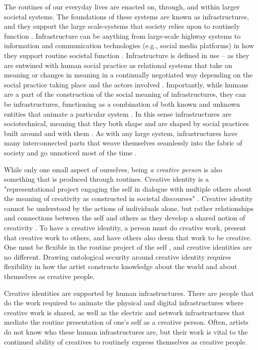     The routines of our everyday lives are enacted on, through, and within larger societal systems. The foundations of these systems are known as infrastructures, and they support the large scale-systems that society relies upon to routinely function \cite{edwards2003infrastructure}. Infrastructure can be anything from large-scale highway systems to information and communication technologies (e.g., social media platforms) in how they support routine societal function \cite{hanseth2010design}. Infrastructure is defined in use – as they are entwined with human social practice as relational systems that take on meaning or changes in meaning in a continually negotiated way depending on the social practice taking place and the actors involved \cite{star1996steps}. Importantly, while humans are a part of the construction of the social meaning of infrastructures, they can be infrastructures, functioning as a combination of both known and unknown entities that animate a particular system \cite{LeeDourishMark2006}. In this sense infrastructures are sociotechnical, meaning that they both shape and are shaped by social practices built around and with them \cite{edwards2003infrastructure, star1996steps}. As with any large system, infrastructures have many interconnected parts that weave themselves seamlessly into the fabric of society and go unnoticed most of the time \cite{star1996steps}. \par

    While only one small aspect of ourselves, being \textit{a creative person} is also something that is produced through routines. Creative identity is a "representational project engaging the self in dialogue with multiple others about the meaning of creativity as constructed in societal discourses" \cite{gluaveanu2014creativity}. Creative identity cannot be understood by the actions of individuals alone, but rather relationships and connections between the self and others as they develop a shared notion of creativity \cite{gluaveanu2014creativity}. To have a creative identity, a person must do creative work, present that creative work to others, and have others also deem that work to be creative. One must be flexible in the routine project of the self \cite{giddens1991modernity}, and creative identities are no different. Drawing ontological security around creative identity requires flexibility in how the artist constructs knowledge about the world and about themselves as creative people. \par
   
    Creative identities are supported by human infrastructures. There are people that do the work required to animate the physical and digital infrastructures where creative work is shared, as well as the electric and network infrastructures that mediate the routine presentation of one's self as a creative person. Often, artists do not know who these human infrastructures are, but their work is vital to the continued ability of creatives to routinely express themselves as creative people. \par

